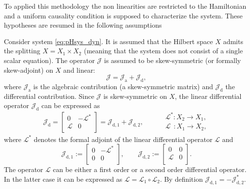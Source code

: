 To applied this methodology the non linearities are restricted to the Hamiltonian and a uniform causality condition is supposed to characterize the system. These hypotheses are resumed in the following assumptions

\begin{assumption}\label{ass:linJ}
	Consider system \eqref{eq:pHsys_dyn}. It is assumed that the Hilbert space $X$ admits the splitting $X = X_1 \times X_2$ (meaning that the system does not consist of a single scalar equation). The operator $\mathcal{J}$ is assumed to be skew-symmetric (or formally skew-adjoint) on $X$ and linear:
	\begin{equation}\label{eq:assJ}
	\mathcal{J} = \mathcal{J}_{\text{a}} + \mathcal{J}_{\text{d}},
	\end{equation}
	where $\mathcal{J}_{\text{a}}$ is the algebraic contribution (a skew-symmetric matrix) and $\mathcal{J}_{\text{d}}$ the differential contribution. Since $\mathcal{J}$ is skew-symmetric on $X$, the linear differential operator $\mathcal{J}_{\text{d}}$ can be expressed as
	\begin{equation}\label{eq:assJd}
	\mathcal{J}_{\text{d}} = 
	\begin{bmatrix}
	0 & -\mathcal{L}^* \\
	\mathcal{L} & 0 \\
	\end{bmatrix} = \mathcal{J}_{\text{d}, 1} + \mathcal{J}_{\text{d}, 2}, \qquad 
	\begin{aligned}
	&\mathcal{L}^* : X_2 \rightarrow X_1, \\
	&\mathcal{L}\;\, : X_1 \rightarrow X_2, \\
	\end{aligned}
	\end{equation}
	where $\mathcal{L}^*$ denotes the formal adjoint of the linear differential operator $\mathcal{L}$ and 
	\begin{equation*}
		\mathcal{J}_{\text{d}, 1}:= \begin{bmatrix}
		0 & -\mathcal{L}^* \\
		0 & 0 \\
		\end{bmatrix}, \qquad 
		\mathcal{J}_{\text{d}, 2} := \begin{bmatrix}
		0 & 0 \\
		\mathcal{L} & 0 \\
		\end{bmatrix}.
	\end{equation*}
	The operator $\mathcal{L}$ can be either a first order or a second order differential operator. In the latter case it can be expressed as $\mathcal{L} = \mathcal{L}_1 \circ \mathcal{L}_2$. By definition $\mathcal{J}_{\text{d}, 1} = - \mathcal{J}_{\text{d}, 2}^*$.
\end{assumption}

